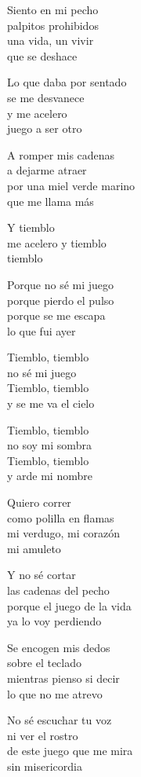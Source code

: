 \begin{lyrics}
Siento en mi pecho\\
palpitos prohibidos\\
una vida, un vivir\\
que se deshace

Lo que daba por sentado\\
se me desvanece\\
y me acelero\\
juego a ser otro

A romper mis cadenas\\
a dejarme atraer\\
por una miel verde marino\\
que me llama más

Y tiemblo\\
me acelero y tiemblo\\
tiemblo

Porque no sé mi juego\\
porque pierdo el pulso\\
porque se me escapa\\
lo que fui ayer

Tiemblo, tiemblo\\
no sé mi juego\\
Tiemblo, tiemblo\\
y se me va el cielo

Tiemblo, tiemblo\\
no soy mi sombra\\
Tiemblo, tiemblo\\
y arde mi nombre

Quiero correr\\
como polilla en flamas\\
mi verdugo, mi corazón\\
mi amuleto

Y no sé cortar\\
las cadenas del pecho\\
porque el juego de la vida\\
ya lo voy perdiendo

Se encogen mis dedos\\
sobre el teclado\\
mientras pienso si decir\\
lo que no me atrevo

No sé escuchar tu voz\\
ni ver el rostro\\
de este juego que me mira\\
sin misericordia


\end{lyrics}
